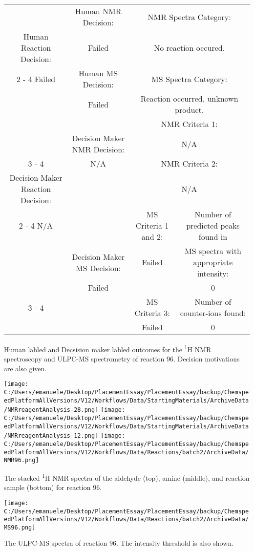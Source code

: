 \documentclass{article}%
\begin{document}
\begin{Decision Table}[H]%
\begin{tabular}{|c|c|c|c|}%
\hline%
&Human NMR Decision:&\multicolumn{2}{|c|}{NMR Spectra Category:}\\%
Human Reaction Decision:&Failed&\multicolumn{2}{|c|}{No reaction occured.}\\%
\cline{2%
-%
4}%
Failed&Human MS Decision:&\multicolumn{2}{|c|}{MS Spectra Category:}\\%
&Failed&\multicolumn{2}{|c|}{Reaction occurred, unknown product.}\\%
\hline%
&&\multicolumn{2}{|c|}{NMR Criteria 1:}\\%
&Decision Maker NMR Decision:&\multicolumn{2}{|c|}{N/A}\\%
\cline{3%
-%
4}%
&N/A&\multicolumn{2}{|c|}{NMR Criteria 2:}\\%
Decision Maker Reaction Decision:&&\multicolumn{2}{|c|}{N/A}\\%
\cline{2%
-%
4}%
N/A&&MS Criteria 1 and 2:&Number of predicted peaks found in\\%
&Decision Maker MS Decision:&Failed&MS spectra with appropriate intensity:\\%
&Failed&&0\\%
\cline{3%
-%
4}%
&&MS Criteria 3:&Number of counter{-}ions found:\\%
&&Failed&0\\%
\hline%
\end{tabular}%
\caption{Human labled and Decsision maker labled outcomes for the \textsuperscript{1}H NMR spectroscopy and ULPC-MS spectrometry of reaction 96. Decision motivations are also given.}%
\end{Decision Table}%
\begin{NMR Spectra}[H]%
\begin{center}%
\texttt{[image: C:/Users/emanuele/Desktop/PlacementEssay/PlacementEssay/backup/ChemspeedPlatformAllVersions/V12/Workflows/Data/StartingMaterials/ArchiveData/NMRreagentAnalysis-28.png]}\hfill%
\texttt{[image: C:/Users/emanuele/Desktop/PlacementEssay/PlacementEssay/backup/ChemspeedPlatformAllVersions/V12/Workflows/Data/StartingMaterials/ArchiveData/NMRreagentAnalysis-12.png]}\hfill%
\texttt{[image: C:/Users/emanuele/Desktop/PlacementEssay/PlacementEssay/backup/ChemspeedPlatformAllVersions/V12/Workflows/Data/Reactions/batch2/ArchiveData/NMR96.png]}\hfill%
\end{center}%
\caption{The stacked \textsuperscript{1}H NMR spectra of the aldehyde (top), amine (middle), and reaction sample (bottom) for reaction 96.}%
\end{NMR Spectra}%
\begin{MS Spectra}[H]%
\begin{center}%
\texttt{[image: C:/Users/emanuele/Desktop/PlacementEssay/PlacementEssay/backup/ChemspeedPlatformAllVersions/V12/Workflows/Data/Reactions/batch2/ArchiveData/MS96.png]}\hfill%
\end{center}%
\caption{The ULPC-MS spectra of reaction 96. The intensity threshold is also shown.}%
\end{MS Spectra}%
\end{document}
